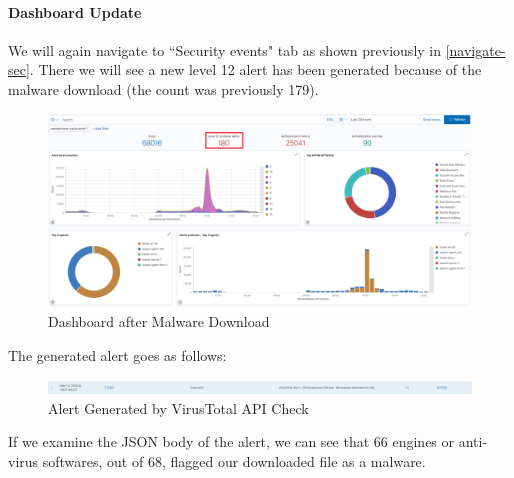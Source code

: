\paragraph{Dashboard Update}
We will again navigate to ``Security events" tab as shown previously in \ref{navigate-sec}. There we will see a new level 12 alert has been generated because of the malware download (the count was previously 179).
    \begin{figure}[H]
        \centering
        \includegraphics[width=\textwidth]{images/malware-detection/virustotal/3.png}
        \caption{Dashboard after Malware Download}
        \label{fig:virustotal-post-download}
    \end{figure}
The generated alert goes as follows:
    \begin{figure}[H]
        \centering
        \includegraphics[width=\textwidth]{images/malware-detection/virustotal/4.png}
        \caption{Alert Generated by VirusTotal API Check}
        \label{fig:virustotal-alert}
    \end{figure}
If we examine the JSON body of the alert, we can see that 66 engines or anti-virus softwares, out of 68, flagged our downloaded file as a malware.
